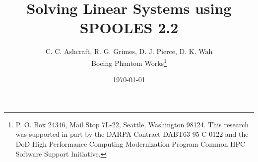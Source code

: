 \documentclass[leqno,10pt,twoside]{article}
\begin{document}


\title{ Solving Linear Systems using {\bf SPOOLES 2.2} }

\author{C. C. Ashcraft, R. G. Grimes, D. J. Pierce, D. K. Wah \\
        Boeing Phantom Works\thanks{
      P. O. Box 24346,
      Mail Stop 7L-22,
      Seattle, Washington 98124.
      This research was supported in part by the DARPA
      Contract DABT63-95-C-0122 and the DoD High Performance Computing
      Modernization Program Common HPC Software Support Initiative.}
}

\date{\today}
\maketitle
\vfill
\eject

\tableofcontents







\appendix





\end{document}
